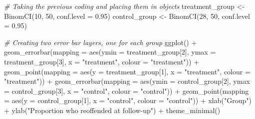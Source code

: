 \documentclass[
]{book}
\newenvironment{Shaded}{\begin{snugshade}}{\end{snugshade}}
\newcommand{\AttributeTok}[1]{\textcolor[rgb]{0.77,0.63,0.00}{#1}}
\newcommand{\CommentTok}[1]{\textcolor[rgb]{0.56,0.35,0.01}{\textit{#1}}}
\newcommand{\DecValTok}[1]{\textcolor[rgb]{0.00,0.00,0.81}{#1}}
\newcommand{\FloatTok}[1]{\textcolor[rgb]{0.00,0.00,0.81}{#1}}
\newcommand{\FunctionTok}[1]{\textcolor[rgb]{0.00,0.00,0.00}{#1}}
\newcommand{\NormalTok}[1]{#1}
\newcommand{\OtherTok}[1]{\textcolor[rgb]{0.56,0.35,0.01}{#1}}
\newcommand{\SpecialCharTok}[1]{\textcolor[rgb]{0.00,0.00,0.00}{#1}}
\newcommand{\StringTok}[1]{\textcolor[rgb]{0.31,0.60,0.02}{#1}}
\begin{document}
\begin{Shaded}
\begin{Highlighting}[]
\CommentTok{\# Taking the previous coding and placing them in objects}
\NormalTok{treatment\_group }\OtherTok{\textless{}{-}} \FunctionTok{BinomCI}\NormalTok{(}\DecValTok{10}\NormalTok{, }\DecValTok{50}\NormalTok{, }\AttributeTok{conf.level =} \FloatTok{0.95}\NormalTok{) }
\NormalTok{control\_group }\OtherTok{\textless{}{-}} \FunctionTok{BinomCI}\NormalTok{(}\DecValTok{28}\NormalTok{, }\DecValTok{50}\NormalTok{, }\AttributeTok{conf.level =} \FloatTok{0.95}\NormalTok{)}

\CommentTok{\# Creating two error bar layers, one for each group}
\FunctionTok{ggplot}\NormalTok{() }\SpecialCharTok{+} 
  \FunctionTok{geom\_errorbar}\NormalTok{(}\AttributeTok{mapping =} \FunctionTok{aes}\NormalTok{(}\AttributeTok{ymin =}\NormalTok{ treatment\_group[}\DecValTok{2}\NormalTok{], }\AttributeTok{ymax =}\NormalTok{ treatment\_group[}\DecValTok{3}\NormalTok{], }\AttributeTok{x =} \StringTok{"treatment"}\NormalTok{, }\AttributeTok{colour =} \StringTok{"treatment"}\NormalTok{)) }\SpecialCharTok{+} 
  \FunctionTok{geom\_point}\NormalTok{(}\AttributeTok{mapping =} \FunctionTok{aes}\NormalTok{(}\AttributeTok{y =}\NormalTok{ treatment\_group[}\DecValTok{1}\NormalTok{], }\AttributeTok{x =} \StringTok{"treatment"}\NormalTok{, }\AttributeTok{colour =} \StringTok{"treatment"}\NormalTok{)) }\SpecialCharTok{+} \FunctionTok{geom\_errorbar}\NormalTok{(}\AttributeTok{mapping =} \FunctionTok{aes}\NormalTok{(}\AttributeTok{ymin =}\NormalTok{ control\_group[}\DecValTok{2}\NormalTok{], }\AttributeTok{ymax =}\NormalTok{ control\_group[}\DecValTok{3}\NormalTok{], }\AttributeTok{x =} \StringTok{"control"}\NormalTok{, }\AttributeTok{colour =} \StringTok{"control"}\NormalTok{)) }\SpecialCharTok{+} 
  \FunctionTok{geom\_point}\NormalTok{(}\AttributeTok{mapping =} \FunctionTok{aes}\NormalTok{(}\AttributeTok{y =}\NormalTok{ control\_group[}\DecValTok{1}\NormalTok{], }\AttributeTok{x =} \StringTok{"control"}\NormalTok{, }\AttributeTok{colour =} \StringTok{"control"}\NormalTok{)) }\SpecialCharTok{+}
  \FunctionTok{xlab}\NormalTok{(}\StringTok{"Group"}\NormalTok{) }\SpecialCharTok{+}
  \FunctionTok{ylab}\NormalTok{(}\StringTok{"Proportion who reoffended at follow{-}up"}\NormalTok{) }\SpecialCharTok{+} 
  \FunctionTok{theme\_minimal}\NormalTok{()}
\end{Highlighting}
\end{Shaded}
\end{document}
